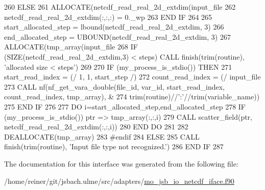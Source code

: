 \begin{DoxyCode}
260       \textcolor{keywordflow}{ELSE}
261         \textcolor{keyword}{ALLOCATE}(netcdf\_read\_real\_2d\_extdim(input\_file%
262         netcdf\_read\_real\_2d\_extdim(:,:,:) = 0.\_wp
263 \textcolor{keywordflow}{      END IF}
264 
265       start\_allocated\_step = lbound(netcdf\_read\_real\_2d\_extdim, 3)
266 \textcolor{keyword}{      end}\_allocated\_step = UBOUND(netcdf\_read\_real\_2d\_extdim, 3)
267       \textcolor{keyword}{ALLOCATE}(tmp\_array(input\_file%
268       \textcolor{keywordflow}{IF} (\textcolor{keyword}{SIZE}(netcdf\_read\_real\_2d\_extdim,3) < steps) \textcolor{keyword}{CALL }finish(trim(routine), \textcolor{stringliteral}{'allocated size < steps'})
269 
270       \textcolor{keywordflow}{IF} (my\_process\_is\_stdio()) \textcolor{keywordflow}{THEN}
271         start\_read\_index = (/ 1, 1, start\_step /)
272         count\_read\_index = (/ input\_file%
273         \textcolor{keyword}{CALL }nf(nf\_get\_vara\_double(file\_id, var\_id, start\_read\_index, count\_read\_index, tmp\_array), &
274           trim(routine)//\textcolor{stringliteral}{':'}//trim(variable\_name))
275 \textcolor{keywordflow}{      END IF}
276 
277       \textcolor{keywordflow}{DO} i=start\_allocated\_step,end\_allocated\_step
278         \textcolor{keywordflow}{IF} (my\_process\_is\_stdio()) ptr => tmp\_array(:,:,i)
279         \textcolor{keyword}{CALL }scatter\_field(ptr, netcdf\_read\_real\_2d\_extdim(:,:,i))
280 \textcolor{keywordflow}{      END DO}
281 
282       \textcolor{keyword}{DEALLOCATE}(tmp\_array)
283 \textcolor{preprocessor}{#endif}
284 \textcolor{preprocessor}{}    \textcolor{keywordflow}{ELSE}
285       \textcolor{keyword}{CALL }finish(trim(routine), \textcolor{stringliteral}{'Input file type not recognized.'})
286 \textcolor{keywordflow}{    END IF}
287 
\end{DoxyCode}


The documentation for this interface was generated from the following file\+:\begin{DoxyCompactItemize}
\item 
/home/reiner/git/jsbach.\+ulme/src/adapters/\hyperlink{mo__jsb__io__netcdf__iface_8f90}{mo\+\_\+jsb\+\_\+io\+\_\+netcdf\+\_\+iface.\+f90}\end{DoxyCompactItemize}
